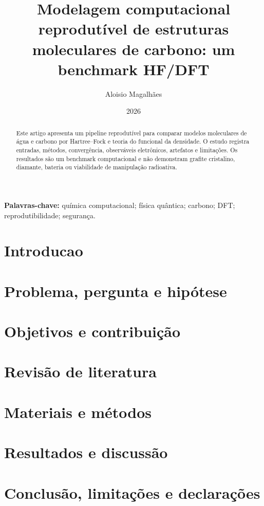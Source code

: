 \documentclass[12pt,a4paper]{article}
\title{Modelagem computacional reprodutível de estruturas moleculares de carbono: um benchmark HF/DFT}
\author{Aloisio Magalhães}
\date{2026}
\begin{document}
\maketitle
\begin{abstract}
Este artigo apresenta um pipeline reprodutível para comparar modelos moleculares de água e carbono por Hartree--Fock e teoria do funcional da densidade. O estudo registra entradas, métodos, convergência, observáveis eletrônicos, artefatos e limitações. Os resultados são um benchmark computacional e não demonstram grafite cristalino, diamante, bateria ou viabilidade de manipulação radioativa.
\end{abstract}
\textbf{Palavras-chave:} química computacional; física quântica; carbono; DFT; reprodutibilidade; segurança.
\section{Introducao}
\section{Problema, pergunta e hipótese}
\section{Objetivos e contribuição}
\section{Revisão de literatura}
\section{Materiais e métodos}
\section{Resultados e discussão}
\section{Conclusão, limitações e declarações}

\end{document}
